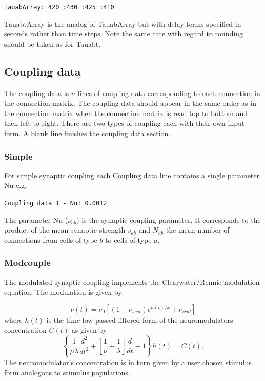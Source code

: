 \documentclass[12pt,a4paper]{article}
\begin{document}
{\tt \small TauabArray: 420 :430 :425 :410}

TauabtArray is the analog of TauabArray but with delay terms specified in
seconds rather than time steps. Note the same care with regard to
rounding should be taken as for Tauabt.

\subsection{Coupling data}
The coupling data is $n$ lines of coupling data corresponding
to each connection in the connection matrix. The coupling data should appear
in the same order as in the connection matrix when the connection matrix is 
read top to bottom and then left to right. There are two types of coupling
each with their own input form.
A blank line finishes the coupling data section.

\subsubsection{Simple}
For simple synaptic coupling each Coupling data line contains a single parameter Nu e.g.

{\tt \small Coupling data 1 - Nu: 0.0012}.

The parameter Nu ($\nu_{ab}$)
is the synaptic coupling
parameter. It corresponds to the product of the mean synaptic strength $s_{ab}$
and $N_{ab}$ the mean number of connections from cells of type $b$ to
cells of type $a$.

\subsubsection{Modcouple}

The modulated synaptic coupling implements the Clearwater/Rennie modulation
equation. The modulation is given by:

\begin{equation}
\nu (t) = \nu_0 \left[ ( 1 - \nu_{scal} ) e^{h(t)/k} + \nu_{scal} \right]
\end{equation}
where $h(t)$ is the time low passed filtered form of the neuromodulators concentration
$C(t)$ as given by
\begin{equation}
\left\{ \frac{1}{\mu \lambda} \frac{d^2}{dt^2} +
  \left[ \frac{1}{\nu}+ \frac{1}{\lambda} 
  \right]
  \frac{d}{dt} + 1
\right\}
h(t) = C(t).
\end{equation}
The neuromodulator's concentration is in turn given by a user chosen
stimulus form analogous to stimulus populations.
\end{document}
